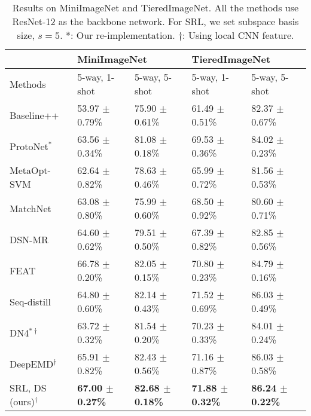 \begin{table*}[t]
\centering
\begin{tabular}{l|ll|ll}
\hline
                            &  \multicolumn{2}{l|}{MiniImageNet}       & \multicolumn{2}{l}{TieredImageNet}      \\ \hline
Methods                      & 5-way, 1-shot      & 5-way, 5-shot      & 5-way, 1-shot      & 5-way, 5-shot      \\ \hline
Baseline++ \cite{chen2019closer}           & 53.97 $\pm$ 0.79\% & 75.90 $\pm$ 0.61\% & 61.49 $\pm$ 0.51\% & 82.37 $\pm$ 0.67\% \\
ProtoNet$^*$ \cite{snell2017prototypical}      & 63.56 $\pm$ 0.34\% & 81.08 $\pm$ 0.18\% & 69.53 $\pm$ 0.36\% & 84.02 $\pm$ 0.23\% \\
MetaOpt-SVM \cite{lee2019meta}                       & 62.64 $\pm$ 0.82\% & 78.63 $\pm$ 0.46\% & 65.99 $\pm$ 0.72\% & 81.56 $\pm$ 0.53\% \\
MatchNet \cite{vinyals2016matching}           & 63.08 $\pm$ 0.80\% & 75.99 $\pm$ 0.60\% & 68.50 $\pm$ 0.92\% & 80.60 $\pm$ 0.71\% \\
DSN-MR \cite{simon2020adaptive}                        & 64.60 $\pm$ 0.62\% & 79.51 $\pm$ 0.50\% & 67.39 $\pm$ 0.82\% & 82.85 $\pm$ 0.56\% \\
FEAT \cite{ye2020few}              & 66.78 $\pm$ 0.20\% & 82.05 $\pm$ 0.15\% & 70.80 $\pm$ 0.23\% & 84.79 $\pm$ 0.16\% \\
Seq-distill  \cite{seqdistill}                     & 64.80 $\pm$ 0.60\% & 82.14 $\pm$ 0.43\% & 71.52 $\pm$ 0.69\% & 86.03 $\pm$ 0.49\% \\
DN4$^{* \dagger}$  \cite{li2019revisiting}           & 63.72 $\pm$ 0.32\% & 81.54 $\pm$ 0.20\% & 70.23 $\pm$ 0.33\% & 84.01 $\pm$ 0.24\% \\
DeepEMD$^{\dagger}$ \cite{zhang2020deepemd}                           & 65.91 $\pm$ 0.82\% & 82.43 $\pm$ 0.56\% & 71.16 $\pm$ 0.87\% & 86.03 $\pm$ 0.58\% \\
SRL, DS (ours)$^\dagger$                    & \textbf{67.00 $\pm$ 0.27\%} & \textbf{82.68 $\pm$ 0.18\%} & \textbf{71.88 $\pm$ 0.32\%} & \textbf{86.24 $\pm$ 0.22\%} \\ \hline
\end{tabular}
\caption{Results on MiniImageNet and TieredImageNet. All the methods use ResNet-12 as the backbone network. For SRL, we set subspace basis size, $s=5$. *: Our re-implementation. $\dagger$: Using local CNN feature.}
\label{tab:sota}
\end{table*}


